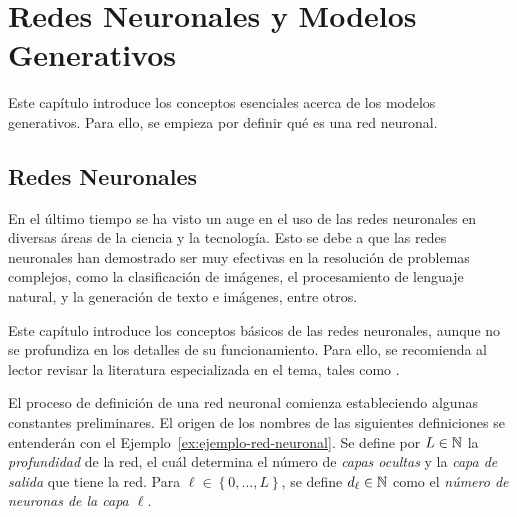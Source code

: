 \chapter{Redes Neuronales y Modelos Generativos}\label{chap:redes-neuronales-y-modelos-generativos}
{
Este capítulo introduce los conceptos esenciales acerca de los modelos generativos. Para ello, se empieza por definir qué es una red neuronal.
\section{Redes Neuronales}\label{sec:redes-Neuronales}
{
    En el último tiempo se ha visto un auge en el uso de las redes neuronales en diversas áreas de la ciencia y la tecnología. Esto se debe a que las redes neuronales han demostrado ser muy efectivas en la resolución de problemas complejos, como la clasificación de imágenes, el procesamiento de lenguaje natural, y la generación de texto e imágenes, entre otros.

    Este capítulo introduce los conceptos básicos de las redes neuronales, aunque no se profundiza en los detalles de su funcionamiento. Para ello, se recomienda al lector revisar la literatura especializada en el tema, tales como \cite{goodfellow2016deep,calin2020deep}.

    El proceso de definición de una red neuronal comienza estableciendo algunas constantes preliminares. El origen de los nombres de las siguientes definiciones se entenderán con el Ejemplo~\ref{ex:ejemplo-red-neuronal}. Se define por $L\in\mathbb{N}$ la \emph{profundidad} de la red, el cuál determina el número de \textit{capas ocultas} y la \textit{capa de salida} que tiene la red. Para $\ell \in \left\{ 0,\ldots, L \right\}$, se define $d_\ell\in\mathbb{N}$ como el \emph{número de neuronas de la capa $\ell$}.

}}
